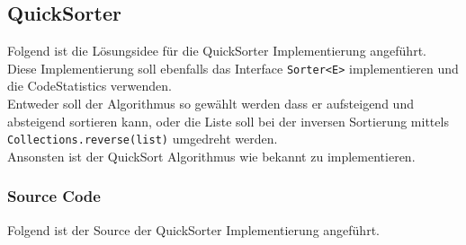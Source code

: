 \documentclass[11pt, a4paper, twoside]{article}   	%
\newcommand{\srcDir}{../src/main/java}
\newcommand{\mainPackage}{\srcDir/at/fhooe/swe4/lab3}
\newcommand{\inlinecode}{\lstinline[style=inlineSource]}
\begin{document}
\subsection{QuickSorter}
Folgend ist die Lösungsidee für die QuickSorter Implementierung angeführt.\\
Diese Implementierung soll ebenfalls das Interface \inlinecode{Sorter<E>} implementieren und die CodeStatistics verwenden.\\
Entweder soll der Algorithmus so gewählt werden dass er aufsteigend und absteigend sortieren kann, oder die  Liste soll bei der inversen Sortierung mittels \inlinecode{Collections.reverse(list)} umgedreht werden.\\
Ansonsten ist der QuickSort Algorithmus wie bekannt zu implementieren.
\newpage
\subsubsection{Source Code}
Folgend ist der Source der QuickSorter Implementierung angeführt.

\newpage
\end{document}
